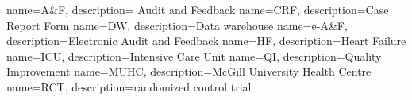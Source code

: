 { name=A\&F, description={ Audit and Feedback } }
 { name=CRF, description={Case Report Form} }
 { name=DW, description={Data warehouse} }
 { name=e-A\&F, description={Electronic Audit and Feedback} }
 { name=HF, description={Heart Failure} }
 { name=ICU, description={Intensive Care Unit} }
 { name=QI, description={Quality Improvement} }
 { name=MUHC, description={McGill University Health Centre} }
 { name=RCT, description={randomized control trial} }
